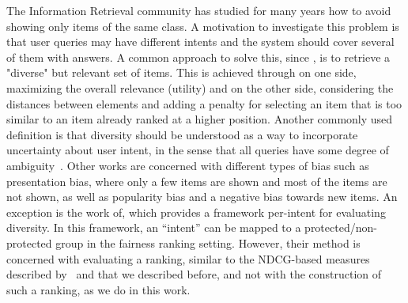 The Information Retrieval community has studied for many years how to avoid showing only items of the same class. A motivation to investigate this problem is that user queries may have different intents and the system should cover several of them with answers.
%
A common approach to solve this, since \citet{carbonell1998use}, is to retrieve a "diverse" but relevant set of items. This is achieved through on one side, maximizing the overall relevance (utility) and on the other side, considering the distances between elements and adding a penalty for selecting an item that is too similar to an item already ranked at a higher position.
%
Another commonly used definition is that diversity should be understood as a way to incorporate uncertainty about user intent, in the sense that all queries have some degree of ambiguity~\cite{agrawal2009diversifying}.
%
Other works \citet{kunaver2017diversity,channamsetty2017recommender} are concerned with different types of bias such as presentation bias, where only a few items are shown and most of the items are not shown, as well as popularity bias and a negative bias towards new items.
%
An exception is the work of\citet{sakai2011evaluating}, which provides a framework per-intent for evaluating diversity. In this framework, an ``intent'' can be mapped to a protected/non-protected group in the fairness ranking setting. However, their method is concerned with evaluating a ranking, similar to the NDCG-based measures described by~\citet{yang2016measuring} and that we described before, and not with the construction of such a ranking, as we do in this work.

